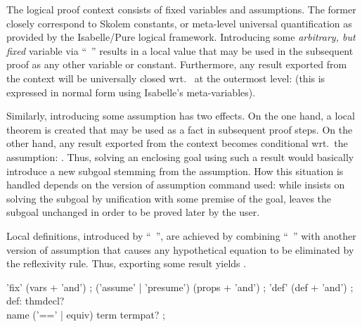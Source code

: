 \begin{isabellebody}
\begin{isamarkuptext}
  The logical proof context consists of fixed variables and
  assumptions.  The former closely correspond to Skolem constants, or
  meta-level universal quantification as provided by the Isabelle/Pure
  logical framework.  Introducing some \emph{arbitrary, but fixed}
  variable via ``\mbox{}~'' results in a local value
  that may be used in the subsequent proof as any other variable or
  constant.  Furthermore, any result  exported from
  the context will be universally closed wrt.\  at the
  outermost level:  (this is expressed in normal
  form using Isabelle's meta-variables).

  Similarly, introducing some assumption \isa{{\isasymchi}} has two effects.
  On the one hand, a local theorem is created that may be used as a
  fact in subsequent proof steps.  On the other hand, any result
  \isa{{\isasymchi}\ {\isasymturnstile}\ {\isasymphi}} exported from the context becomes conditional wrt.\
  the assumption: \isa{{\isasymturnstile}\ {\isasymchi}\ {\isasymLongrightarrow}\ {\isasymphi}}.  Thus, solving an enclosing goal
  using such a result would basically introduce a new subgoal stemming
  from the assumption.  How this situation is handled depends on the
  version of assumption command used: while \mbox{}
  insists on solving the subgoal by unification with some premise of
  the goal, \mbox{\isa{\isacommand{presume}}} leaves the subgoal unchanged in order
  to be proved later by the user.

  Local definitions, introduced by ``\mbox{}~'', are achieved by combining ``\mbox{}~'' with
  another version of assumption that causes any hypothetical equation
  \isa{x\ {\isasymequiv}\ t} to be eliminated by the reflexivity rule.  Thus,
  exporting some result  yields .

  \begin{rail}
    'fix' (vars + 'and')
    ;
    ('assume' | 'presume') (props + 'and')
    ;
    'def' (def + 'and')
    ;
    def: thmdecl? \\ name ('==' | equiv) term termpat?
    ;
  \end{rail}


\end{isamarkuptext}
\end{isabellebody}
